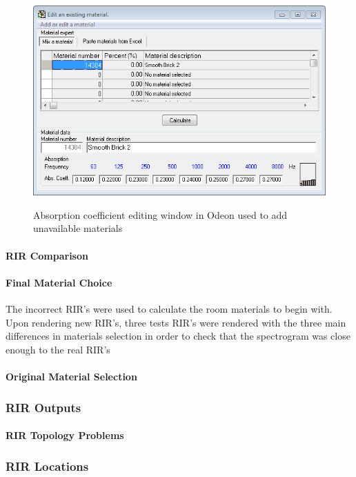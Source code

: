 \documentclass[../../main.tex]{subfiles}
\begin{document}
			\begin{figure}[ht]
				\center\includegraphics[scale = 1]{Sections/Implementation/Odeon/images/Absorption.PNG}
				\label{materialEdit}
				\caption{Absorption coefficient editing window in Odeon used to add unavailable materials}
			\end{figure}



		\paragraph{RIR Comparison}

		\paragraph{Final Material Choice}

			The incorrect \ac{RIR}'s were used to calculate the room materials to begin with. Upon rendering new \ac{RIR}'s, three tests \ac{RIR}'s were rendered with the three main differences in materials selection in order to check that the spectrogram was close enough to the real \ac{RIR}'s
			\paragraph{Original Material Selection}

	\subsubsection{RIR Outputs}

		\paragraph{RIR Topology Problems}




	\subsubsection{RIR Locations}
	
\end{document}
